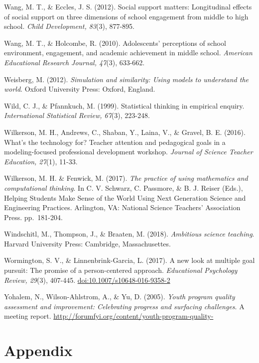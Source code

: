 \documentclass[]{msu-thesis}
\theoremstyle{definition}
\theoremstyle{definition}
\theoremstyle{definition}
\theoremstyle{remark}
\begin{document}
Wang, M. T., \& Eccles, J. S. (2012). Social support matters:
Longitudinal effects of social support on three dimensions of school
engagement from middle to high school. \emph{Child Development, 83}(3),
877-895.

Wang, M. T., \& Holcombe, R. (2010). Adolescents' perceptions of school
environment, engagement, and academic achievement in middle school.
\emph{American Educational Research Journal, 47}(3), 633-662.

Weisberg, M. (2012). \emph{Simulation and similarity: Using models to
understand the world}. Oxford University Press: Oxford, England.

Wild, C. J., \& Pfannkuch, M. (1999). Statistical thinking in empirical
enquiry. \emph{International Statistical Review, 67}(3), 223-248.

Wilkerson, M. H., Andrews, C., Shaban, Y., Laina, V., \& Gravel, B. E.
(2016). What's the technology for? Teacher attention and pedagogical
goals in a modeling-focused professional development workshop.
\emph{Journal of Science Teacher Education, 27}(1), 11-33.

Wilkerson, M. H. \& Fenwick, M. (2017). \emph{The practice of using
mathematics and computational thinking}. In C. V. Schwarz, C. Passmore,
\& B. J. Reiser (Eds.), Helping Students Make Sense of the World Using
Next Generation Science and Engineering Practices. Arlington, VA:
National Science Teachers' Association Press. pp.~181-204.

Windschitl, M., Thompson, J., \& Braaten, M. (2018). \emph{Ambitious
science teaching}. Harvard University Press: Cambridge, Massachusettes.

Wormington, S. V., \& Linnenbrink-Garcia, L. (2017). A new look at
multiple goal pursuit: The promise of a person-centered approach.
\emph{Educational Psychology Review, 29}(3), 407-445.
\url{doi:10.1007/s10648-016-9358-2}

Yohalem, N., Wilson-Ahlstrom, A., \& Yu, D. (2005). \emph{Youth program
quality assessment and improvement: Celebrating progress and surfacing
challenges}. A meeting report.
\url{http://forumfyi.org/content/youth-program-quality-}

\chapter{Appendix}\label{appendix}

\setlength{\parindent}{0in} \setlength{\leftskip}{0in}
\setlength{\parskip}{8pt} \noindent
\end{document}
